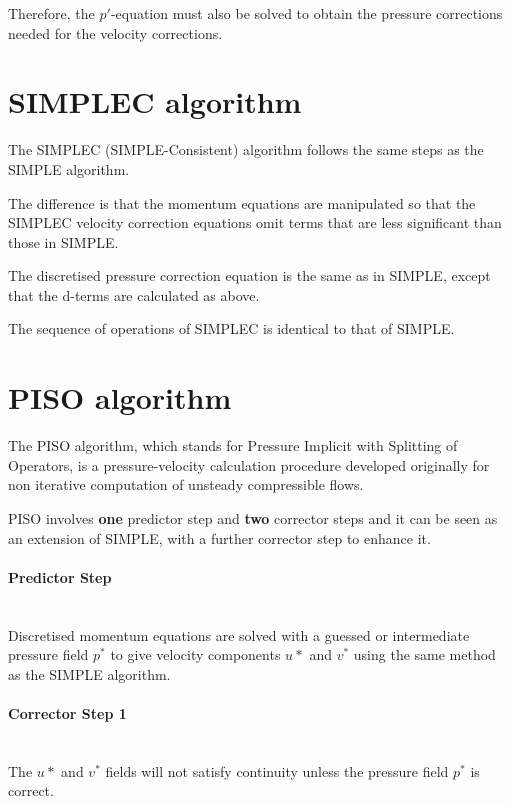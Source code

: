 \documentclass[a4paper, 15pt]{article}
\begin{document}
Therefore,
the $p'$-equation must also be solved to
obtain the pressure corrections needed for the
velocity corrections. 

\section{SIMPLEC algorithm}

The SIMPLEC (SIMPLE-Consistent) algorithm follows the same
steps as the SIMPLE algorithm. \newline 

The difference is that the momentum equations are manipulated so that the SIMPLEC velocity
correction equations omit terms that are less significant than those in SIMPLE. \newline 

The discretised pressure correction equation is the same as in SIMPLE, except that the d-terms
are calculated as above. \newline 

The sequence of operations of SIMPLEC is identical to that of SIMPLE.


\section{PISO algorithm}

The
PISO algorithm, which stands for Pressure Implicit with Splitting of Operators,
is a pressure-velocity calculation procedure developed originally for non iterative computation
of unsteady compressible flows. \newline 

PISO
involves \textbf{one} predictor step and \textbf{two} corrector steps and it can be seen as an extension of
SIMPLE, with a further corrector step to enhance it.

\paragraph*{Predictor Step} \mbox{} \\
Discretised
momentum equations are solved with a guessed or intermediate pressure field $p^*$ to
give velocity components $u*$ and $v^*$ using the same method as the SIMPLE algorithm. 

\paragraph*{Corrector Step 1} \mbox{} \\
The $u*$ and $v^*$ fields will not satisfy continuity unless the pressure field $p^*$ is correct. \newline 
\end{document}
